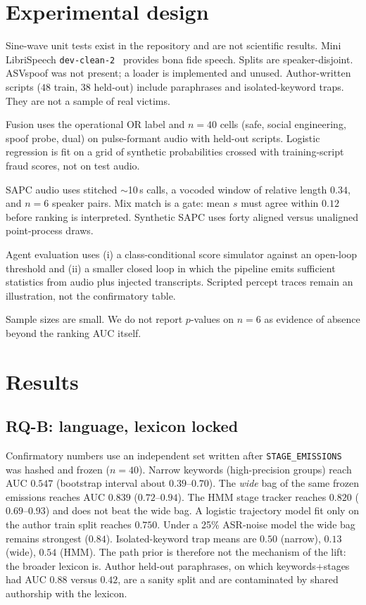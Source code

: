 \documentclass[11pt]{article}
\begin{document}
\section{Experimental design}

Sine-wave unit tests exist in the repository and are not scientific results. Mini LibriSpeech \texttt{dev-clean-2}~\cite{panayotov2015librispeech} provides bona fide speech. Splits are speaker-disjoint. ASVspoof was not present; a loader is implemented and unused. Author-written scripts ($48$ train, $38$ held-out) include paraphrases and isolated-keyword traps. They are not a sample of real victims.

Fusion uses the operational OR label and $n{=}40$ cells (safe, social engineering, spoof probe, dual) on pulse-formant audio with held-out scripts. Logistic regression is fit on a grid of synthetic probabilities crossed with training-script fraud scores, not on test audio.

SAPC audio uses stitched $\sim$10\,s calls, a vocoded window of relative length $0.34$, and $n{=}6$ speaker pairs. Mix match is a gate: mean $s$ must agree within $0.12$ before ranking is interpreted. Synthetic SAPC uses forty aligned versus unaligned point-process draws.

Agent evaluation uses (i) a class-conditional score simulator against an open-loop threshold and (ii) a smaller closed loop in which the pipeline emits sufficient statistics from audio plus injected transcripts. Scripted percept traces remain an illustration, not the confirmatory table.

Sample sizes are small. We do not report $p$-values on $n{=}6$ as evidence of absence beyond the ranking AUC itself.

\section{Results}

\subsection{RQ-B: language, lexicon locked}
Confirmatory numbers use an independent set written after \texttt{STAGE\_EMISSIONS} was hashed and frozen ($n{=}40$). Narrow keywords (high-precision groups) reach AUC $0.547$ (bootstrap interval about $0.39$--$0.70$). The \emph{wide} bag of the same frozen emissions reaches AUC $0.839$ ($0.72$--$0.94$). The HMM stage tracker reaches $0.820$ ($0.69$--$0.93$) and does not beat the wide bag. A logistic trajectory model fit only on the author train split reaches $0.750$. Under a 25\% ASR-noise model the wide bag remains strongest ($0.84$). Isolated-keyword trap means are $0.50$ (narrow), $0.13$ (wide), $0.54$ (HMM). The path prior is therefore not the mechanism of the lift: the broader lexicon is. Author held-out paraphrases, on which keywords+stages had AUC $0.88$ versus $0.42$, are a sanity split and are contaminated by shared authorship with the lexicon.
\end{document}
